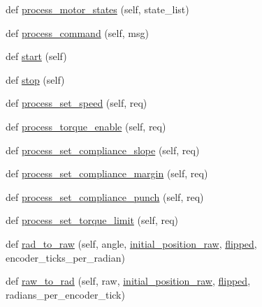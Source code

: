 \begin{DoxyCompactItemize}
\item 
def \hyperlink{classdynamixel__controllers_1_1joint__torque__controller_1_1_joint_torque_controller_a272b1c9a711f608b3761e27a30e0ec80}{process\+\_\+motor\+\_\+states} (self, state\+\_\+list)
\item 
def \hyperlink{classdynamixel__controllers_1_1joint__torque__controller_1_1_joint_torque_controller_a4bb191d488e477451bf954fb439f3573}{process\+\_\+command} (self, msg)
\item 
def \hyperlink{classdynamixel__controllers_1_1joint__controller_1_1_joint_controller_a8da16a8b801f868a4de7c68d6adc851f}{start} (self)
\item 
def \hyperlink{classdynamixel__controllers_1_1joint__controller_1_1_joint_controller_a978da6ac850b0dd6a67ebe4a23f8fcdc}{stop} (self)
\item 
def \hyperlink{classdynamixel__controllers_1_1joint__controller_1_1_joint_controller_a97af096c1566307859ed168c900fa8a6}{process\+\_\+set\+\_\+speed} (self, req)
\item 
def \hyperlink{classdynamixel__controllers_1_1joint__controller_1_1_joint_controller_a2181fcf467234ed09e378a93ea5a0553}{process\+\_\+torque\+\_\+enable} (self, req)
\item 
def \hyperlink{classdynamixel__controllers_1_1joint__controller_1_1_joint_controller_a6390c0c20afc0581dd3b1122c894d175}{process\+\_\+set\+\_\+compliance\+\_\+slope} (self, req)
\item 
def \hyperlink{classdynamixel__controllers_1_1joint__controller_1_1_joint_controller_aed0bae387958b56f88fd707e9da9e8f1}{process\+\_\+set\+\_\+compliance\+\_\+margin} (self, req)
\item 
def \hyperlink{classdynamixel__controllers_1_1joint__controller_1_1_joint_controller_ac3d7aea8d47f24ab10c1162f34cce44f}{process\+\_\+set\+\_\+compliance\+\_\+punch} (self, req)
\item 
def \hyperlink{classdynamixel__controllers_1_1joint__controller_1_1_joint_controller_aa199ce6ae353ed44fe71ae96a5da242d}{process\+\_\+set\+\_\+torque\+\_\+limit} (self, req)
\item 
def \hyperlink{classdynamixel__controllers_1_1joint__controller_1_1_joint_controller_aea21e76e178029b31cd40b3e0335b621}{rad\+\_\+to\+\_\+raw} (self, angle, \hyperlink{classdynamixel__controllers_1_1joint__torque__controller_1_1_joint_torque_controller_ad24688a323847dd322cbedb657932738}{initial\+\_\+position\+\_\+raw}, \hyperlink{classdynamixel__controllers_1_1joint__torque__controller_1_1_joint_torque_controller_a172d6e36ab7a230fb6dd5227bcb303d8}{flipped}, encoder\+\_\+ticks\+\_\+per\+\_\+radian)
\item 
def \hyperlink{classdynamixel__controllers_1_1joint__controller_1_1_joint_controller_a58a58e669c2918d00cc358f2b58d061c}{raw\+\_\+to\+\_\+rad} (self, raw, \hyperlink{classdynamixel__controllers_1_1joint__torque__controller_1_1_joint_torque_controller_ad24688a323847dd322cbedb657932738}{initial\+\_\+position\+\_\+raw}, \hyperlink{classdynamixel__controllers_1_1joint__torque__controller_1_1_joint_torque_controller_a172d6e36ab7a230fb6dd5227bcb303d8}{flipped}, radians\+\_\+per\+\_\+encoder\+\_\+tick)
\end{DoxyCompactItemize}
